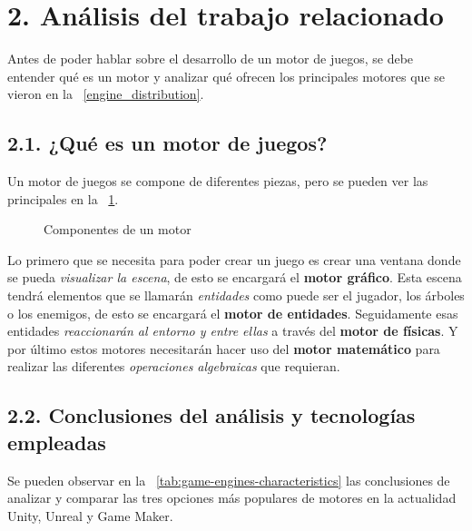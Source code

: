 \chapter*{2. Análisis del trabajo relacionado}\label{cap:analysis}

Antes de poder hablar sobre el desarrollo de un motor de juegos, se debe entender qué es un motor y analizar qué ofrecen los principales
motores que se vieron en la \figurename~\ref{engine_distribution}. 

\section*{2.1. ¿Qué es un motor de juegos?}\label{sec:game-engine}

Un motor de juegos se compone de diferentes piezas, pero se pueden ver las principales en la \figurename~\ref{engine_components}.

\begin{figure}[h!]
    \centering
    \caption{Componentes de un motor}
    \label{engine_components}
\end{figure}

Lo primero que se necesita para poder crear un juego es crear una ventana donde se pueda \textit{visualizar la escena}, 
de esto se encargará el \textbf{motor gráfico}. Esta escena tendrá elementos que se llamarán \textit{entidades} como puede ser el jugador,
los árboles o los enemigos, de esto se encargará el \textbf{motor de entidades}. Seguidamente esas entidades \textit{reaccionarán al
entorno y entre ellas} a través del \textbf{motor de físicas}. Y por último estos motores necesitarán hacer uso del \textbf{motor matemático}
para realizar las diferentes \textit{operaciones algebraicas} que requieran.

\newpage

\section*{2.2. Conclusiones del análisis y tecnologías empleadas}\label{sec:technologies}

Se pueden observar en la \tablename~\ref{tab:game-engines-characteristics} las conclusiones de analizar y comparar las tres opciones más populares de motores en la actualidad\cite{comparing-engines} Unity\cite{unity}, Unreal\cite{unreal} y Game Maker\cite{gamemaker}.

